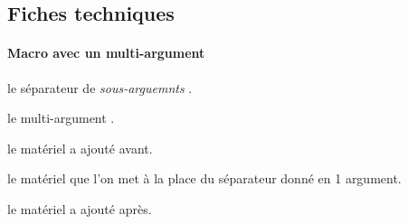 \documentclass[12pt,a4paper]{article}
\begin{document}


\subsection{Fiches techniques}

\paragraph{Macro avec un \og multi-argument \fg}


 le séparateur de \emph{\og sous-arguemnts \fg}.

 le \og multi-argument \fg.

 le matériel a ajouté avant.

 le matériel que l'on met à la place du séparateur donné en 1\ier{} argument.

 le matériel a ajouté après.
\end{document}
